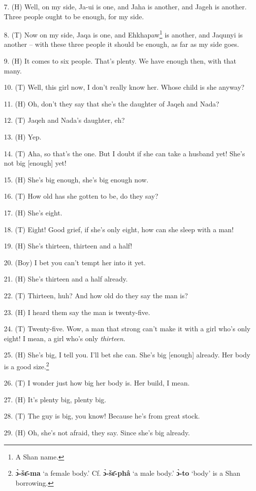 7. (H) Well, on my side, Ja-ui is one, and Jaha is another, and Jageh is another.
Three people ought to be enough, for my side.

8. (T) Now on my side, Jaqa is one, and Ehkhapaw\footnote{A Shan name.} is another, and Jaqunyi is
another -- with these three people it should be enough, as far as my side goes.

9. (H) It comes to six people. That's plenty. We have enough then, with that many.

10. (T) Well, this girl now, I don't really know her. Whose child is she anyway?

11. (H) Oh, don't they say that she's the daughter of Jaqeh and Nada?

12. (T) Jaqeh and Nada's daughter, eh?

13. (H) Yep.

14. (T) Aha, so that's the one. But I doubt if she can take a husband yet! She's
not big [enough] yet!

15. (H) She's big enough, she's big enough now.

16. (T) How old has she gotten to be, do they say?

17. (H) She's eight.

18. (T) Eight! Good grief, if she's only eight, how can she sleep with a man!

19. (H)  She's thirteen, thirteen and a half!

20. (Boy) I bet you can't tempt her into it yet.

21. (H) She's thirteen and a half already.

22. (T) Thirteen, huh? And how old do they say the man is?

23. (H) I heard them say the man is twenty-five.

24. (T) Twenty-five. Wow, a man that strong can't make it with a girl who's only
eight! I mean, a girl who's only \textit{thirteen}.

25. (H) She's big, I tell you. I'll bet she can. She's big [enough] already. Her
body is a good size.\footnote{\textbf{ɔ̀-šɛ̄-ma} `a female body.' Cf. \textbf{ɔ̀-šɛ̄-phâ} `a male body.' \textbf{ɔ̀-to} `body' is a Shan borrowing.}

26. (T) I wonder just how big her body is. Her build, I mean.

27. (H) It's plenty big, plenty big.

28. (T) The guy is big, you know! Because he's from great stock.

29. (H) Oh, she's not afraid, they say. Since she's big already.


